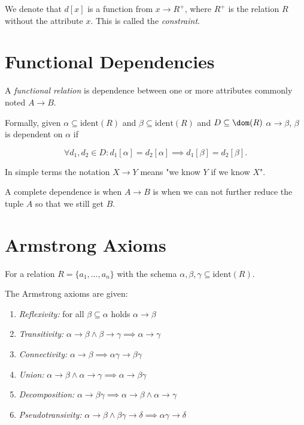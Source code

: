 We denote that \(d[x]\) is a function from \(x \to R^+\), where \(R^+\) is the relation \(R\) without the attribute \(x\).
This is called the \emph{constraint}.

\section{Functional Dependencies}

A \emph{functional relation} is dependence between one or more attributes commonly noted \(A \to B\).

Formally, given \(\alpha \subseteq \mathrm{ident}(R)\) and \(\beta \subseteq \mathrm{ident}(R)\) and \(D \subseteq \dom(R)\)
\(\alpha \to \beta\), \(\beta\) is dependent on \(\alpha\) if

\[
    \forall d_1, d_2 \in D: d_1[\alpha] = d_2[\alpha] \implies d_1[\beta] = d_2[\beta].
\]

In simple terms the notation \( X \to Y\) means "we know \(Y\) if we know \(X\)".

A complete dependence is when \(A \to B\) is when we can not further reduce the tuple \(A\) 
so that we still get \(B\).

\section{Armstrong Axioms}

For a relation \(R = \{a_1, \dots, a_n\}\) with the schema \(\alpha, \beta, \gamma \subseteq \mathrm{ident}(R)\).

The Armstrong axioms are given: 

\begin{enumerate}[label = \Roman*.]

    \item \emph{Reflexivity:} for all \(\beta \subseteq \alpha\) holds \(\alpha \to \beta\)

    \item \emph{Transitivity:} \(\alpha \to \beta \land \beta \to \gamma \implies \alpha \to \gamma\)

    \item \emph{Connectivity:} \(\alpha \to \beta \implies \alpha \gamma \to \beta \gamma\)

    \item \emph{Union:} \(\alpha \to \beta \land \alpha \to \gamma \implies \alpha \to \beta \gamma\)

    \item \emph{Decomposition:} \(\alpha \to \beta \gamma \implies \alpha \to \beta \land \alpha \to \gamma\)

    \item \emph{Pseudotransivity:} \(\alpha \to \beta \land \beta \gamma \to \delta \implies \alpha \gamma \to \delta\)

\end{enumerate}

